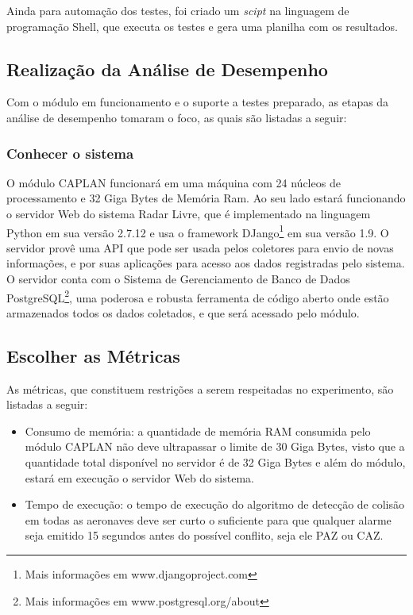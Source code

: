 Ainda para automação dos testes, foi criado um \textit{scipt} na linguagem de programação Shell, que executa os testes e gera uma planilha com os resultados.



\subsection{Realização da Análise de Desempenho}

Com o módulo em funcionamento e o suporte a testes preparado, as etapas da análise de desempenho tomaram o foco, as quais são listadas a seguir:

\subsubsection{Conhecer o sistema}

O módulo CAPLAN funcionará em uma máquina com 24 núcleos de processamento e 32 Giga Bytes de Memória Ram. Ao seu lado estará funcionando o servidor Web do sistema Radar Livre, que é implementado na linguagem Python em sua versão 2.7.12 e usa o framework DJango\footnote{Mais informações em www.djangoproject.com} em sua versão 1.9. O servidor provê uma API que pode ser usada pelos coletores para envio de novas informações, e por suas aplicações para acesso aos dados registradas pelo sistema. O servidor conta com o Sistema de Gerenciamento de Banco de Dados PostgreSQL\footnote{Mais informações em www.postgresql.org/about}, uma poderosa e robusta ferramenta de código aberto onde estão armazenados todos os dados coletados, e que será acessado pelo módulo.

\subsection{Escolher as Métricas}

As métricas, que constituem restrições a serem respeitadas no experimento, são listadas a seguir:

\begin{itemize}

\item Consumo de memória: a quantidade de memória RAM consumida pelo módulo CAPLAN não deve ultrapassar o limite de 30 Giga Bytes, visto que a quantidade total disponível no servidor é de 32 Giga Bytes e além do módulo, estará em execução o servidor Web do sistema.

\item Tempo de execução: o tempo de execução do algoritmo de detecção de colisão em todas as aeronaves deve ser curto o suficiente para que qualquer alarme seja emitido 15 segundos antes do possível conflito, seja ele PAZ ou CAZ.


\end{itemize}



